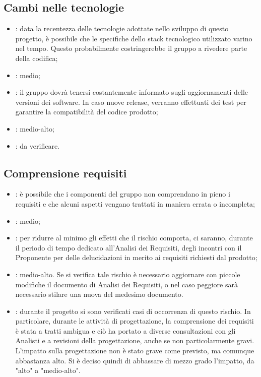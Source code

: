 \subsection{Cambi nelle tecnologie}
\begin{itemize}
\item {}: data la recentezza delle tecnologie adottate nello sviluppo di questo progetto, è possibile che le specifiche dello stack tecnologico utilizzato varino nel tempo. Questo probabilmente costringerebbe il gruppo a rivedere parte della codifica;
\item {}: medio;
\item {}: il gruppo dovrà tenersi costantemente informato sugli aggiornamenti delle versioni dei software. In caso nuove release, verranno effettuati dei test per garantire la compatibilità del codice prodotto;
\item {}: medio-alto;
\item {}: da verificare.
\end{itemize}

\subsection{Comprensione requisiti}
\begin{itemize}
\item {}: è possibile che i componenti del gruppo non comprendano in pieno i requisiti e che alcuni aspetti vengano trattati in maniera errata o incompleta;
\item {}: medio;
\item {}: per ridurre al minimo gli effetti che il rischio comporta, ci saranno, durante il periodo di tempo dedicato all'Analisi dei Requisiti, degli incontri con il Proponente per delle delucidazioni in merito ai requisiti richiesti dal prodotto;
\item {}: medio-alto. Se si verifica tale rischio è necessario aggiornare con piccole modifiche il documento di Analisi dei Requisiti, o nel caso peggiore sarà necessario stilare una nuova  del medesimo documento.
\item {}: durante il progetto si sono verificati casi di occorrenza di questo rischio. In particolare, durante le attività di progettazione, la comprensione dei requisiti è stata a tratti ambigua e ciò ha portato a diverse consultazioni con gli Analisti e a revisioni della progettazione, anche se non particolarmente gravi. L'impatto sulla progettazione non è stato grave come previsto, ma comunque abbastanza alto. Si è deciso quindi di abbassare di mezzo grado l'impatto, da "alto" a "medio-alto".
\end{itemize}

